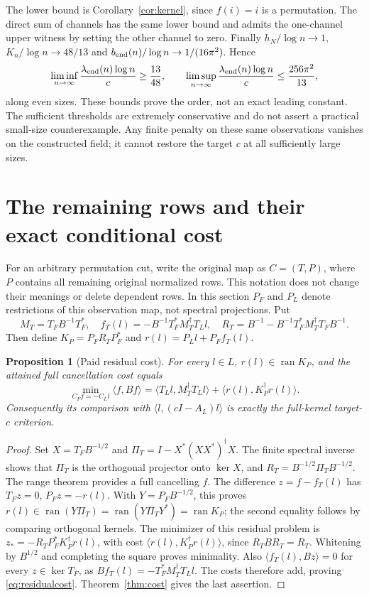 \documentclass[11pt]{article}
\newcommand{\ip}[2]{\langle#1,#2\rangle}
\DeclareMathOperator{\ran}{ran}
\newtheorem{proposition}[theorem]{Proposition}
\theoremstyle{definition}
\theoremstyle{remark}
\begin{document}
The lower bound is Corollary~\ref{cor:kernel}, since $f(i)=i$ is a
permutation. The direct sum of channels has the same lower bound and
admits the one-channel upper witness by setting the other channel to zero.
Finally $h_N/\log n\to1$, $K_n/\log n\to48/13$ and
$b_{\rm end}(n)/\log n\to1/(16\pi^2)$. Hence
\[
 \liminf_{n\to\infty}\frac{\lambda_{\rm end}(n)\log n}{c}
 \ge\frac{13}{48},\qquad
 \limsup_{n\to\infty}\frac{\lambda_{\rm end}(n)\log n}{c}
 \le\frac{256\pi^2}{13},
\]
along even sizes. These bounds prove the order, not an exact leading
constant. The sufficient thresholds are extremely conservative and do
not assert a practical small-size counterexample. Any finite penalty on
these same observations vanishes on the constructed field; it cannot
restore the target $c$ at all sufficiently large sizes.

\section{The remaining rows and their exact conditional cost}\label{sec:residual}
For an arbitrary permutation cut, write the original map as $C=(T,P)$,
where $P$ contains all remaining original normalized rows. This notation
does not change their meanings or delete dependent rows. In this section
$P_F$ and $P_L$ denote restrictions of this observation map, not spectral
projections. Put
\[
 M_T=T_FB^{-1}T_F^*,\quad
 f_T(l)=-B^{-1}T_F^*M_T^\dagger T_Ll,\quad
 R_T=B^{-1}-B^{-1}T_F^*M_T^\dagger T_FB^{-1}.
\]
Then define $K_P=P_FR_TP_F^*$ and $r(l)=P_Ll+P_Ff_T(l)$.

\begin{proposition}[Paid residual cost]\label{prop:residual}
For every $l\in L$, $r(l)\in\ran K_P$, and the attained full cancellation
cost equals
\begin{equation}\label{eq:residualcost}
 \min_{C_Ff=-C_Ll}\ip f{Bf}
 =\ip{T_Ll}{M_T^\dagger T_Ll}
       +\ip{r(l)}{K_P^\dagger r(l)}.
\end{equation}
Consequently its comparison with $\ip l{(cI-A_L)l}$ is exactly the
full-kernel target-$c$ criterion.
\end{proposition}
\begin{proof}
Set $X=T_FB^{-1/2}$ and $\Pi_T=I-X^*(XX^*)^\dagger X$.
The finite spectral inverse shows that $\Pi_T$ is the orthogonal projector
onto $\ker X$, and $R_T=B^{-1/2}\Pi_TB^{-1/2}$.
The range theorem provides a full cancelling $f$. The difference
$z=f-f_T(l)$ has $T_Fz=0$, $P_Fz=-r(l)$. With $Y=P_FB^{-1/2}$,
this proves $r(l)\in\ran(Y\Pi_T)=\ran(Y\Pi_TY^*)=\ran K_P$;
the second equality follows by comparing orthogonal kernels.
The minimizer of this residual problem is
$z_*=-R_TP_F^*K_P^\dagger r(l)$, with cost
$\ip{r(l)}{K_P^\dagger r(l)}$, since $R_TBR_T=R_T$.
Whitening by $B^{1/2}$ and completing the square proves minimality.
Also $\ip{f_T(l)}{Bz}=0$ for every $z\in\ker T_F$, as
$Bf_T(l)=-T_F^*M_T^\dagger T_Ll$. The costs therefore add, proving
\eqref{eq:residualcost}. Theorem~\ref{thm:cost} gives the last assertion.
\end{proof}
\end{document}
